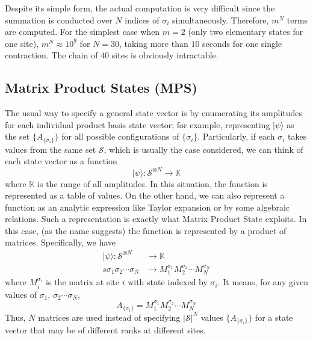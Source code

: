 \documentclass[english]{article}
\begin{document}
Despite its simple form, the actual computation is very difficult since
the summation is conducted over $N$ indices of $\sigma_{i}$
simultaneously. Therefore, $m^{N}$ terms are computed. For the simplest case when
$m=2$ (only two elementary states for one site), $m^{N}\approx10^{9}$
for $N=30$, taking more than $10$ seconds for one single contraction.
The chain of $40$ sites is obviously intractable.

\subsection{Matrix Product States (MPS)}

The usual way to specify a general state vector is by enumerating its amplitudes for each individual product basis state vector; for example, representing $|\psi\rangle$ as the set $\{A_{\{\sigma_i\}}\}$ for all possible configurations of $\{\sigma_i\}$. Particularly, if each $\sigma_i$ takes values from the same set $\mathcal{S}$, which is usually the case considered, we can think of each state vector as a function 
\begin{displaymath}
|\psi\rangle: \mathcal{S}^{\otimes N} \rightarrow \mathbb{K}
\end{displaymath}
where $\mathbb{K}$ is the range of all amplitudes. In this situation, the function is represented as a table of values. On the other hand, we can also represent a function as an analytic expression like Taylor expansion or by some algebraic relations. Such a representation is exactly what Matrix Product State exploits. In this case, (as the name suggests) the function is represented by a product of matrices. Specifically, we have
\begin{displaymath}
\begin{split}
|\psi\rangle: \mathcal{S}^{\otimes N} &\rightarrow \mathbb{K} \\s
\sigma_1\sigma_2\cdots\sigma_N &\rightarrow M_1^{\sigma_1}M_2^{\sigma_2}\cdots M_N^{\sigma_N}
\end{split}
\end{displaymath}
where $M_i^{\sigma_i}$ is the matrix at site $i$ with state indexed by $\sigma_i$. It means, for any given values of $\sigma_1$, $\sigma_2 \cdots \sigma_N$,
\begin{displaymath}
A_{\{\sigma_i\}} = M_1^{\sigma_1}M_2^{\sigma_2}\cdots M_N^{\sigma_N}
\end{displaymath}
Thus, $N$  matrices are used instead of specifying $|\mathcal{S}|^N$ values $\{A_{\{\sigma_i\}}\}$ for a state vector that may be of different ranks at different sites.
\end{document}
